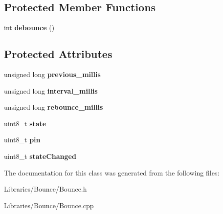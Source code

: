 \subsection*{Protected Member Functions}
\begin{DoxyCompactItemize}
\item 
\hypertarget{class_bounce_aee8349a42e798e59a2fea9c3dca53569}{}int {\bfseries debounce} ()\label{class_bounce_aee8349a42e798e59a2fea9c3dca53569}

\end{DoxyCompactItemize}
\subsection*{Protected Attributes}
\begin{DoxyCompactItemize}
\item 
\hypertarget{class_bounce_a223ab27b8094acd12d77a3a9145f56c9}{}unsigned long {\bfseries previous\+\_\+millis}\label{class_bounce_a223ab27b8094acd12d77a3a9145f56c9}

\item 
\hypertarget{class_bounce_a12f15211cdbc690e81a4a054183820bd}{}unsigned long {\bfseries interval\+\_\+millis}\label{class_bounce_a12f15211cdbc690e81a4a054183820bd}

\item 
\hypertarget{class_bounce_a6ddea36f65ef856546e3365af929ace6}{}unsigned long {\bfseries rebounce\+\_\+millis}\label{class_bounce_a6ddea36f65ef856546e3365af929ace6}

\item 
\hypertarget{class_bounce_af013db8b02e1e252eb60dd5b40d5480b}{}uint8\+\_\+t {\bfseries state}\label{class_bounce_af013db8b02e1e252eb60dd5b40d5480b}

\item 
\hypertarget{class_bounce_a1cb79cb0ba2379cd12cc7c098d97053a}{}uint8\+\_\+t {\bfseries pin}\label{class_bounce_a1cb79cb0ba2379cd12cc7c098d97053a}

\item 
\hypertarget{class_bounce_aee4ce3c901eaac62efc5d6bdb7beccdd}{}uint8\+\_\+t {\bfseries state\+Changed}\label{class_bounce_aee4ce3c901eaac62efc5d6bdb7beccdd}

\end{DoxyCompactItemize}


The documentation for this class was generated from the following files\+:\begin{DoxyCompactItemize}
\item 
Libraries/\+Bounce/Bounce.\+h\item 
Libraries/\+Bounce/Bounce.\+cpp\end{DoxyCompactItemize}
